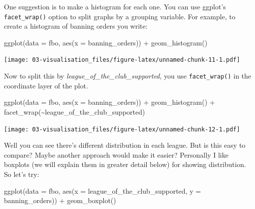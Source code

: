\documentclass[
]{book}
\newenvironment{Shaded}{\begin{snugshade}}{\end{snugshade}}
\newcommand{\AttributeTok}[1]{\textcolor[rgb]{0.77,0.63,0.00}{#1}}
\newcommand{\FunctionTok}[1]{\textcolor[rgb]{0.00,0.00,0.00}{#1}}
\newcommand{\NormalTok}[1]{#1}
\newcommand{\SpecialCharTok}[1]{\textcolor[rgb]{0.00,0.00,0.00}{#1}}
\begin{document}
One suggestion is to make a histogram for each one. You can use ggplot's \texttt{facet\_wrap()} option to split graphs by a grouping variable. For example, to create a histogram of banning orders you write:

\begin{Shaded}
\begin{Highlighting}[]
\FunctionTok{ggplot}\NormalTok{(}\AttributeTok{data =}\NormalTok{ fbo, }\FunctionTok{aes}\NormalTok{(}\AttributeTok{x =}\NormalTok{ banning\_orders)) }\SpecialCharTok{+} 
  \FunctionTok{geom\_histogram}\NormalTok{()}
\end{Highlighting}
\end{Shaded}

\texttt{[image: 03-visualisation\_files/figure-latex/unnamed-chunk-11-1.pdf]}

Now to split this by \emph{league\_of\_the\_club\_supported}, you use \texttt{facet\_wrap()} in the coordinate layer of the plot.

\begin{Shaded}
\begin{Highlighting}[]
\FunctionTok{ggplot}\NormalTok{(}\AttributeTok{data =}\NormalTok{ fbo, }\FunctionTok{aes}\NormalTok{(}\AttributeTok{x =}\NormalTok{ banning\_orders)) }\SpecialCharTok{+} 
  \FunctionTok{geom\_histogram}\NormalTok{() }\SpecialCharTok{+} 
  \FunctionTok{facet\_wrap}\NormalTok{(}\SpecialCharTok{\textasciitilde{}}\NormalTok{league\_of\_the\_club\_supported)}
\end{Highlighting}
\end{Shaded}

\texttt{[image: 03-visualisation\_files/figure-latex/unnamed-chunk-12-1.pdf]}

Well you can see there's different distribution in each league. But is this easy to compare? Maybe another approach would make it easier?
Personally I like boxplots (we will explain them in greater detail below) for showing distribution. So let's try:

\begin{Shaded}
\begin{Highlighting}[]
\FunctionTok{ggplot}\NormalTok{(}\AttributeTok{data =}\NormalTok{ fbo, }\FunctionTok{aes}\NormalTok{(}\AttributeTok{x =}\NormalTok{ league\_of\_the\_club\_supported, }\AttributeTok{y =}\NormalTok{ banning\_orders)) }\SpecialCharTok{+} 
  \FunctionTok{geom\_boxplot}\NormalTok{() }
\end{Highlighting}
\end{Shaded}
\end{document}
